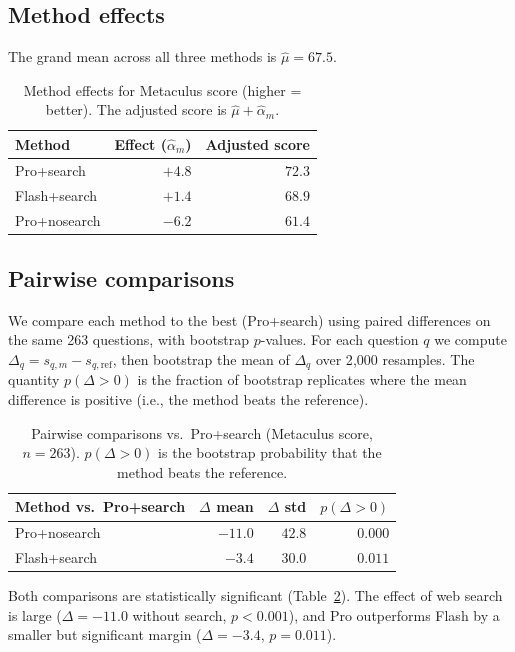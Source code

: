 \documentclass[11pt]{article}
\begin{document}
\subsection{Method effects}

The grand mean across all three methods is $\hat{\mu} = 67.5$.

\begin{table}[h]
\centering
\begin{tabular}{lrr}
\toprule
Method & Effect ($\hat{\alpha}_m$) & Adjusted score \\
\midrule
Pro+search      & $+4.8$ & $72.3$ \\
Flash+search    & $+1.4$ & $68.9$ \\
Pro+nosearch    & $-6.2$ & $61.4$ \\
\bottomrule
\end{tabular}
\caption{Method effects for Metaculus score (higher = better).
  The adjusted score is $\hat{\mu} + \hat{\alpha}_m$.}
\label{tab:metaculus_effects}
\end{table}

\subsection{Pairwise comparisons}

We compare each method to the best (Pro+search) using paired differences
on the same 263 questions, with bootstrap $p$-values.
For each question $q$ we compute
$\Delta_q = s_{q,m} - s_{q,\mathrm{ref}}$, then bootstrap the mean
of $\Delta_q$ over 2{,}000 resamples.  The quantity $p(\Delta > 0)$ is the
fraction of bootstrap replicates where the mean difference is positive
(i.e., the method beats the reference).

\begin{table}[h]
\centering
\begin{tabular}{lrrr}
\toprule
Method vs.\ Pro+search & $\Delta$ mean & $\Delta$ std & $p(\Delta > 0)$ \\
\midrule
Pro+nosearch     & $-11.0$ & $42.8$ & $0.000$ \\
Flash+search     & $-3.4$  & $30.0$ & $0.011$ \\
\bottomrule
\end{tabular}
\caption{Pairwise comparisons vs.\ Pro+search (Metaculus score, $n=263$).
  $p(\Delta > 0)$ is the bootstrap probability that the method beats
  the reference.}
\label{tab:metaculus_pairwise}
\end{table}

Both comparisons are statistically significant (Table~\ref{tab:metaculus_pairwise}).
The effect of web search is large ($\Delta = -11.0$ without search,
$p < 0.001$), and Pro outperforms Flash by a smaller but significant margin
($\Delta = -3.4$, $p = 0.011$).
\end{document}
